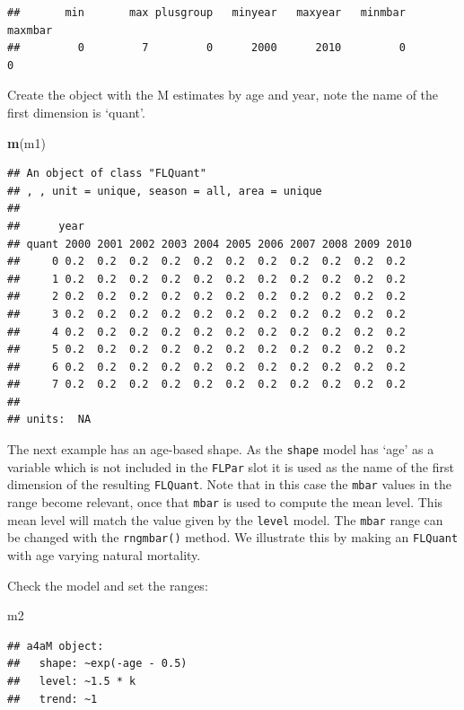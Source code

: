 \documentclass[
]{book}
\newenvironment{Shaded}{\begin{snugshade}}{\end{snugshade}}
\newcommand{\FunctionTok}[1]{\textcolor[rgb]{0.13,0.29,0.53}{\textbf{#1}}}
\newcommand{\NormalTok}[1]{#1}
\begin{document}
\begin{verbatim}
##       min       max plusgroup   minyear   maxyear   minmbar   maxmbar 
##         0         7         0      2000      2010         0         0
\end{verbatim}

Create the object with the M estimates by age and year, note the name of the first dimension is `quant'.

\begin{Shaded}
\begin{Highlighting}[]
\FunctionTok{m}\NormalTok{(m1)}
\end{Highlighting}
\end{Shaded}

\begin{verbatim}
## An object of class "FLQuant"
## , , unit = unique, season = all, area = unique
## 
##      year
## quant 2000 2001 2002 2003 2004 2005 2006 2007 2008 2009 2010
##     0 0.2  0.2  0.2  0.2  0.2  0.2  0.2  0.2  0.2  0.2  0.2 
##     1 0.2  0.2  0.2  0.2  0.2  0.2  0.2  0.2  0.2  0.2  0.2 
##     2 0.2  0.2  0.2  0.2  0.2  0.2  0.2  0.2  0.2  0.2  0.2 
##     3 0.2  0.2  0.2  0.2  0.2  0.2  0.2  0.2  0.2  0.2  0.2 
##     4 0.2  0.2  0.2  0.2  0.2  0.2  0.2  0.2  0.2  0.2  0.2 
##     5 0.2  0.2  0.2  0.2  0.2  0.2  0.2  0.2  0.2  0.2  0.2 
##     6 0.2  0.2  0.2  0.2  0.2  0.2  0.2  0.2  0.2  0.2  0.2 
##     7 0.2  0.2  0.2  0.2  0.2  0.2  0.2  0.2  0.2  0.2  0.2 
## 
## units:  NA
\end{verbatim}

The next example has an age-based shape. As the \texttt{shape} model has `age' as a variable which is not included in the \texttt{FLPar} slot it is used as the name of the first dimension of the resulting \texttt{FLQuant}. Note that in this case the \texttt{mbar} values in the range become relevant, once that \texttt{mbar} is used to compute the mean level. This mean level will match the value given by the \texttt{level} model. The \texttt{mbar} range can be changed with the \texttt{rngmbar()} method. We illustrate this by making an \texttt{FLQuant} with age varying natural mortality.

Check the model and set the ranges:

\begin{Shaded}
\begin{Highlighting}[]
\NormalTok{m2}
\end{Highlighting}
\end{Shaded}

\begin{verbatim}
## a4aM object:
##   shape: ~exp(-age - 0.5)
##   level: ~1.5 * k
##   trend: ~1
\end{verbatim}
\end{document}
